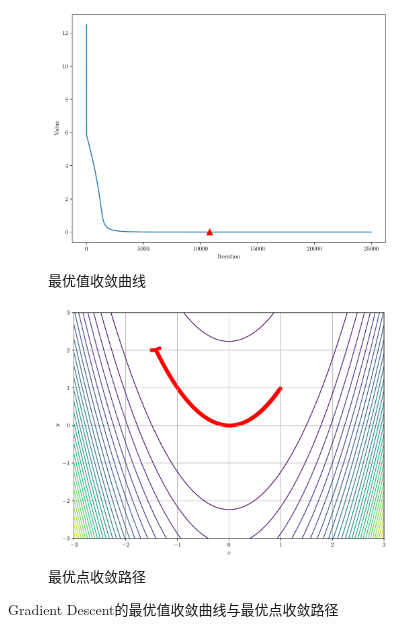 \begin{figure}[!ht]
    \centering
    \begin{subfigure}{0.4\textwidth}
        \centering
        \includegraphics[width=\textwidth]{figures/Gradient Descent_loss.pdf}
        \caption{最优值收敛曲线}
    \end{subfigure}
    \begin{subfigure}{0.4\textwidth}
        \centering
        \includegraphics[width=\textwidth]{figures/Gradient Descent_points.pdf}
        \caption{最优点收敛路径}
    \end{subfigure}
    \caption{Gradient Descent的最优值收敛曲线与最优点收敛路径}
\end{figure}
